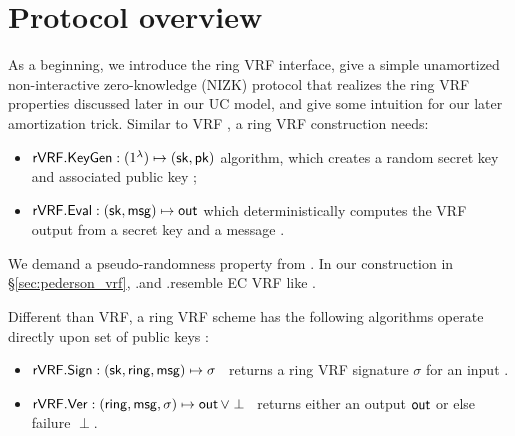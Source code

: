 \section{Protocol overview}
\label{sec:overview}

As a beginning, we introduce the ring VRF interface, give a simple
unamortized non-interactive zero-knowledge (NIZK) protocol that
realizes the ring VRF properties discussed later in our UC model,
and give some intuition for our later amortization trick.
Similar to VRF \cite{vrf_micali}, a ring VRF construction needs: 

\begin{itemize}
\item ${\mathsf{rVRF}}.{\mathsf{KeyGen}} : (1^{\lambda}) \mapsto (\mathsf{sk}, \mathsf{pk})$ algorithm,
 which creates a random secret key \sk and associated public key \pk;

\item ${\mathsf{rVRF}}.{\mathsf{Eval}} : (\mathsf{sk},\mathsf{msg}) \mapsto {\ensuremath{\mathsf{out}}}$ which deterministically computes the VRF output \Out from a secret key \sk and a message \msg.
\end{itemize}
%


We demand a pseudo-randomness property from \Eval. In our construction in \S\ref{sec:pederson_vrf},  \rVRF.\KeyGen and \rVRF.\Eval resemble EC VRF like \cite{nsec5,VXEd25519,draft-irtf-cfrg-vrf-10}.


Different than VRF, a ring VRF scheme has  the following algorithms operate directly upon
 set of public keys \ring:
\begin{itemize}
\item ${\mathsf{rVRF}}.{\mathsf{Sign}} : (\mathsf{sk},\mathsf{ring},\mathsf{msg}) \mapsto \sigma$ \,
    returns a ring VRF signature $\sigma$ for an input \msg.
\item ${\mathsf{rVRF}}.{\mathsf{Ver}} : (\mathsf{ring},\mathsf{msg},\sigma) \mapsto {\ensuremath{\mathsf{out}}} \, \lor \perp$ \,
    returns either an output ${\mathsf{out}}$ or else failure $\perp$.
\end{itemize}

